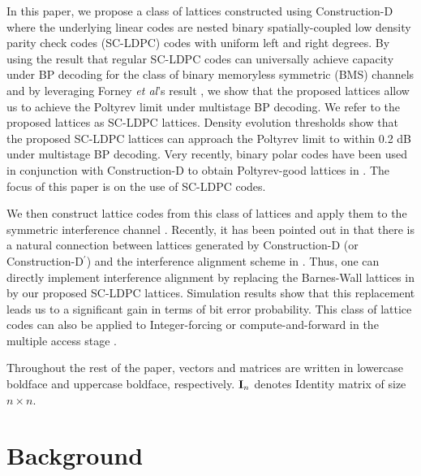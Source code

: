 In this paper, we propose a class of lattices constructed using Construction-D \cite{BarnesSloane83} where the underlying linear codes are nested binary spatially-coupled low density parity check codes (SC-LDPC) codes with uniform left and right degrees. By using the result that regular SC-LDPC codes can universally achieve capacity under BP decoding for the class of binary memoryless symmetric (BMS) channels  \cite{kudekaruniversal,kumar2014threshold} and by leveraging Forney {\em et al}'s result \cite{forney2000}, we show that the proposed lattices allow us to achieve the Poltyrev limit under multistage BP decoding. We refer to the proposed lattices as SC-LDPC lattices. Density evolution thresholds show that the proposed SC-LDPC lattices can approach the Poltyrev limit to within 0.2 dB under multistage BP decoding. Very recently, binary polar codes have been used in conjunction with Construction-D to obtain Poltyrev-good lattices in \cite{YanLingWu13}. The focus of this paper is on the use of SC-LDPC codes.

We then construct lattice codes from this class of lattices and apply them to the symmetric interference channel \cite{jafar10}.  Recently, it has been pointed out in \cite{Estela13} that there is a natural connection between lattices generated by Construction-D (or Construction-D$^\prime$) and the interference alignment scheme in \cite{jafar10}. Thus, one can directly implement interference alignment by replacing the
Barnes-Wall lattices in \cite{Estela13} by our proposed SC-LDPC lattices. Simulation results show that this replacement
leads us to a significant gain in terms of bit error probability. This class of lattice codes can also be applied to Integer-forcing or compute-and-forward in the multiple access stage \cite{nazer2011CF}.

Throughout the rest of the paper, vectors and matrices are written in lowercase boldface and uppercase boldface, respectively. $\mathbf{I}_{n}$ denotes Identity matrix of size $n\times n$.

\section{Background}\label{Section:Background}
